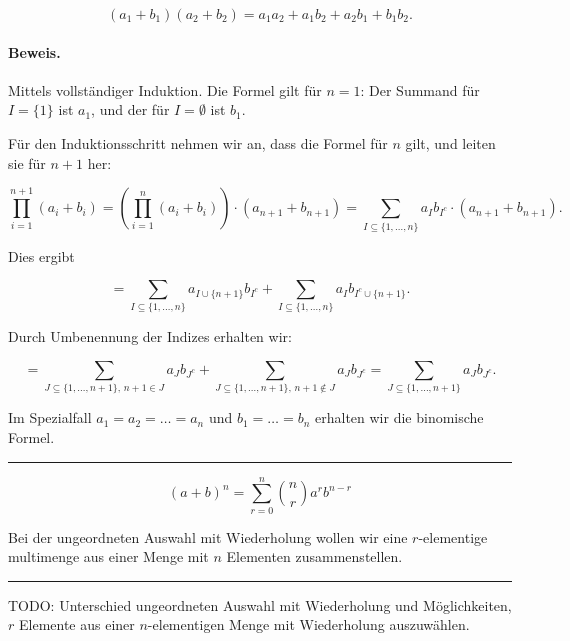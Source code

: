 \documentclass[9pt]{article}
\begin{document}
\begin{bsp}

\[
(a_1 + b_1)(a_2 + b_2) = a_1 a_2 + a_1 b_2 + a_2 b_1 + b_1 b_2.
\]

\paragraph{Beweis.} Mittels vollständiger Induktion. Die Formel gilt für \( n = 1 \): Der Summand für \( I = \{1\} \) ist \( a_1 \), und der für \( I = \emptyset \) ist \( b_1 \).

Für den Induktionsschritt nehmen wir an, dass die Formel für \( n \) gilt, und leiten sie für \( n + 1 \) her:

\[
\prod_{i=1}^{n+1} (a_i + b_i) = \left( \prod_{i=1}^n (a_i + b_i) \right) \cdot (a_{n+1} + b_{n+1}) = \sum_{I \subseteq \{1, \dots, n\}} a_I b_{I^c} \cdot (a_{n+1} + b_{n+1}).
\]

Dies ergibt

\[
= \sum_{I \subseteq \{1, \dots, n\}} a_{I \cup \{n+1\}} b_{I^c} + \sum_{I \subseteq \{1, \dots, n\}} a_I b_{I^c \cup \{n+1\}}.
\]

Durch Umbenennung der Indizes erhalten wir:

\[
= \sum_{J \subseteq \{1, \dots, n+1\}, \, n+1 \in J} a_J b_{J^c} + \sum_{J \subseteq \{1, \dots, n+1\}, \, n+1 \notin J} a_J b_{J^c}
= \sum_{J \subseteq \{1, \dots, n+1\}} a_J b_{J^c}.
\]

Im Spezialfall \( a_1 = a_2 = \dots = a_n \) und \( b_1 = \dots = b_n \) erhalten wir die binomische Formel.
\end{bsp} \noindent \rule{8cm}{0.4pt}
\begin{folg}

\[
(a + b)^n = \sum_{r=0}^{n} \binom{n}{r} a^r b^{n-r}
\]

Bei der ungeordneten Auswahl mit Wiederholung wollen wir eine \( r \)-elementige \gls{multimenge} aus einer Menge mit \( n \) Elementen zusammenstellen.
\end{folg} \noindent \rule{8cm}{0.4pt}

TODO: Unterschied ungeordneten Auswahl mit Wiederholung und Möglichkeiten, \( r \) Elemente aus einer \( n \)-elementigen Menge mit Wiederholung auszuwählen.
\end{document}
